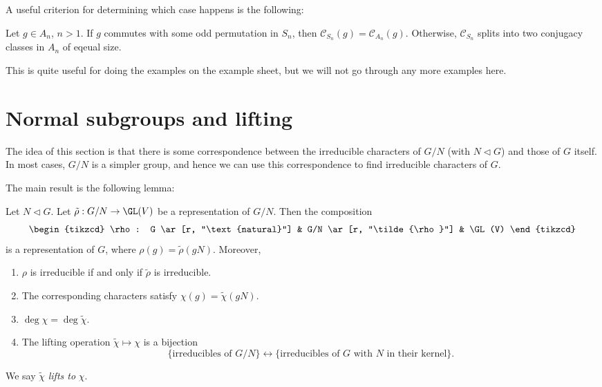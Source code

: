 \documentclass[a4paper]{article}
\begin{document}
A useful criterion for determining which case happens is the following:

\begin{lemma}
  Let $g \in A_n$, $n > 1$. If $g$ commutes with some odd permutation in $S_n$, then $\mathcal{C}_{S_n}(g) = \mathcal{C}_{A_n}(g)$. Otherwise, $\mathcal{C}_{S_n}$ splits into two conjugacy classes in $A_n$ of eqeual size.
\end{lemma}

This is quite useful for doing the examples on the example sheet, but we will not go through any more examples here.

\section{Normal subgroups and lifting}
The idea of this section is that there is some correspondence between the irreducible characters of $G/N$ (with $N \lhd G$) and those of $G$ itself. In most cases, $G/N$ is a simpler group, and hence we can use this correspondence to find irreducible characters of $G$.

The main result is the following lemma:

\begin{lemma}
  Let $N \lhd G$. Let $\tilde{\rho}: G/N \to \GL(V)$ be a representation of $G/N$. Then the composition
  \[
    \begin{tikzcd}
      \rho: G \ar[r, "\text{natural}"] & G/N \ar[r, "\tilde{\rho}"] & \GL(V)
    \end{tikzcd}
  \]
  is a representation of $G$, where $\rho(g) = \tilde{\rho}(gN)$. Moreover,
  \begin{enumerate}
    \item $\rho$ is irreducible if and only if $\tilde{\rho}$ is irreducible.
    \item The corresponding characters satisfy $\chi(g) = \tilde{\chi}(gN)$.
    \item $\deg \chi = \deg \tilde{\chi}$.
    \item The lifting operation $\tilde{\chi} \mapsto \chi$ is a bijection
      \[
        \{\text{irreducibles of }G/N\} \longleftrightarrow \{\text{irreducibles of $G$ with $N$ in their kernel}\}.
      \]
  \end{enumerate}
  We say $\tilde{\chi}$ \emph{lifts to} $\chi$.
\end{lemma}
\end{document}
